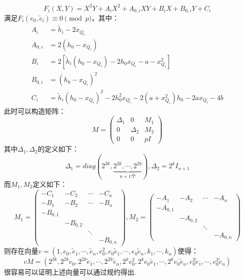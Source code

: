 \documentclass{book}
\numberwithin{equation}{subsubsection}
\begin{document}
\begin{equation}
    F_i(X,Y)=X^2Y+A_iX^2+A_{0,i}XY+B_iX+B_{0,i}Y+C_i
    \nonumber
\end{equation}
满足$F_i(e_0,\widetilde{e}_i)\equiv0\pmod{p}$，其中：
\begin{equation}
    \begin{aligned}
        A_i&=\widetilde{h}_i-2x_{Q_i}\\
        A_{0,i}&=2(h_0-x_{Q_i})\\
        B_i&=2[\widetilde{h}_i(h_0-x_{Q_i})-2h_0x_{Q_i}-a-x_{Q_i}^2]\\
        B_{0,i}&=(h_0-x_{Q_i})^2\\
        C_i&=\widetilde{h}_i(h_0-x_{Q_i})^2-2h_0^2x_{Q_i}-2(a+x_{Q_i}^2)h_0-2ax_{Q_i}-4b
    \end{aligned}
    \nonumber
\end{equation}
此时可以构造矩阵：
\begin{equation}
    M=\left(\begin{matrix}
        \Delta_1&0&M_1\\
        0&\Delta_2&M_2\\
        0&0&pI
    \end{matrix}\right)
    \nonumber
\end{equation}
其中$\Delta_1,\Delta_2$的定义如下：
\begin{equation}
    \Delta_1=diag(2^{3k},\underbrace{2^{2k},\cdots,2^{2k}}_{n+1个}),
    \Delta_2=2^kI_{n+1}
    \nonumber
\end{equation}
而$M_1,M_2$定义如下：
\begin{equation}
    M_1=\left(\begin{matrix}
        -C_1&-C_2&\cdots&-C_n\\
        -B_1&-B_2&\cdots&-B_n\\
        -B_{0,1}&&\\
        &-B_{0,2}&\\
        &&\ddots&\\
        &&&-B_{0,n}
    \end{matrix}\right),
    M_2=\left(\begin{matrix}
        -A_1&-A_2&\cdots&-A_n\\
        -A_{0,1}&&\\
        &-A_{0,2}&\\
        &&\ddots&\\
        &&&-A_{0,n}
    \end{matrix}\right)
    \nonumber
\end{equation}
则存在向量$v=(1,e_0,\widetilde{e}_1,\cdots,\widetilde{e}_n,e_0^2,e_0\widetilde{e}_1,\cdots,e_0\widetilde{e}_n,k_1,\cdots,k_n)$使得：
\begin{equation}
    vM=(2^{3k},2^{2k}e_0,2^{2k}\widetilde{e}_1,\cdots,2^{2k}\widetilde{e}_n,2^ke_0^2,2^ke_0\widetilde{e}_1,\cdots,2^ke_0\widetilde{e}_n,e_0^2\widetilde{e}_1,\cdots,e_0^2\widetilde{e}_n)
    \nonumber
\end{equation}
很容易可以证明上述向量可以通过规约得出.
\end{document}
